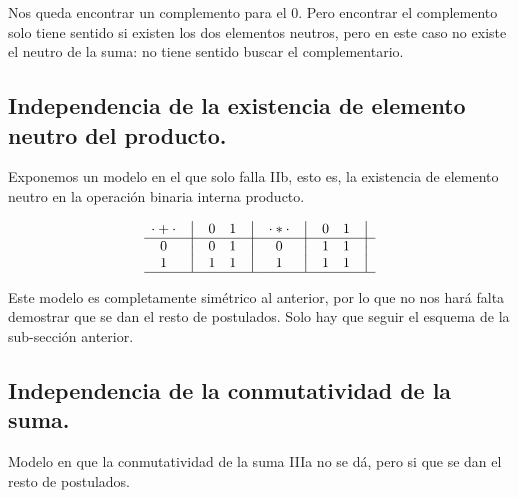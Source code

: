 \documentclass[12pt,a4paper]{article}
\begin{document}
	Nos queda encontrar un complemento para el \(0\). Pero encontrar el
complemento solo tiene sentido si existen los dos elementos neutros, pero en
este caso no existe el neutro de la suma: no tiene sentido buscar el
complementario.



\subsection{Independencia de la existencia de elemento neutro del producto.}



	Exponemos un modelo en el que solo falla IIb, esto es, la existencia de elemento neutro en la operación binaria interna producto.



\[
    \begin{matrix}
        {\cdot + \cdot} & \big{\vert} & {0} & {1} & \big{\vert} \\
        \hline
        {0}             & \big{\vert} & {0} & {1} & \big{\vert} \\
        {1}             & \big{\vert} & {1} & {1} & \big{\vert} \\
        \hline
    \end{matrix}
    \quad
    \begin{matrix}
        {\cdot * \cdot} & \big{\vert} & {0} & {1} & \big{\vert} \\
        \hline
        {0}                   & \big{\vert} & {1} & {1} & \big{\vert} \\
        {1}                   & \big{\vert} & {1} & {1} & \big{\vert} \\
        \hline
    \end{matrix}
\]


	Este modelo es completamente simétrico al anterior, por lo que no nos
hará falta demostrar que se dan el resto de postulados. Solo hay que seguir
el esquema de la sub-sección anterior.



\subsection{Independencia de la conmutatividad de la suma.}



	Modelo en que la conmutatividad de la suma IIIa no se dá, pero
si que se dan el resto de postulados.
\end{document}
